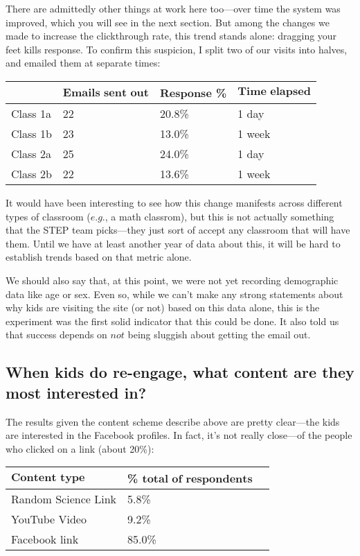\documentclass[11pt,a4paper]{article}
\begin{document}
There are admittedly other things at work here too---over time the system was improved, which you will see in the next section. But among the changes we made to increase the clickthrough rate, this trend stands alone: dragging your feet kills response. To confirm this suspicion, I split two of our visits into halves, and emailed them at separate times:

\begin{center}
\begin{tabular}{l | l l l }
   & $\textbf{Emails sent out}$ & $\textbf{Response}$ \% & $\textbf{Time elapsed}$ \\
   \hline 
   Class 1a & 22 & 20.8\% & 1 day \\
   Class 1b & 23 & 13.0\% & 1 week \\
   \hline
   Class 2a & 25 & 24.0\% & 1 day \\
   Class 2b & 22 & 13.6\% & 1 week \\
\end{tabular}
\end{center}

It would have been interesting to see how this change manifests across different types of classroom ($\textit{e.g.}$, a math classrom), but this is not actually something that the STEP team picks---they just sort of accept any classroom that will have them. Until we have at least another year of data about this, it will be hard to establish trends based on that metric alone.

We should also say that, at this point, we were not yet recording demographic data like age or sex. Even so, while we can't make any strong statements about why kids are visiting the site (or not) based on this data alone, this is the experiment was the first solid indicator that this could be done. It also told us that success depends on $\textit{not}$ being sluggish about getting the email out.

\subsection{When kids do re-engage, what content are they most interested in?}

The results given the content scheme describe above are pretty clear---the kids are interested in the Facebook profiles. In fact, it's not really close---of the people who clicked on a link (about 20\%):

\begin{center}
\begin{tabular}{l | l c }
   $\textbf{Content type}$ & \% $\textbf{total of respondents}$ \\
   \hline
   Random Science Link & 5.8\% \\
   YouTube Video & 9.2\% \\
   Facebook link & 85.0\% \\
\end{tabular}
\end{center}
\end{document}

